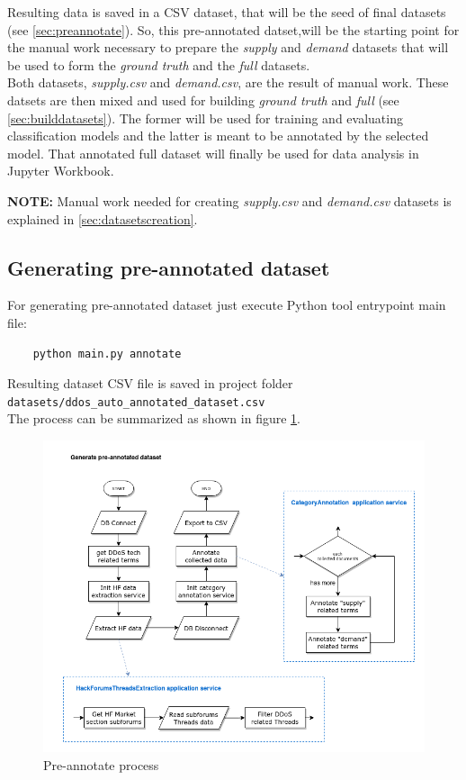 Resulting data is saved in a CSV dataset, that will be the seed of final datasets (see \autoref{sec:preannotate}). So, this pre-annotated datset,will be the starting point for the manual work necessary to prepare the \textit{supply} and \textit{demand} datasets that will be used to form the \textit{ground truth} and the \textit{full} datasets. \\
Both datasets, \textit{supply.csv} and \textit{demand.csv}, are the result of manual work. These datsets are then mixed and used for building \textit{ground truth} and \textit{full} (see \autoref{sec:builddatasets}). The former will be used for training and evaluating classification models and the latter is meant to be annotated by the selected model. That annotated full dataset will finally be used for data analysis in Jupyter Workbook.

\textbf{NOTE: } Manual work needed for creating \textit{supply.csv} and \textit{demand.csv} datasets is explained in \autoref{sec:datasetscreation}.

\newpage

\subsection{Generating pre-annotated dataset}
\label{sec:preannotate}

For generating pre-annotated dataset just execute Python tool entrypoint main file:
\begin{verbatim}
    python main.py annotate
\end{verbatim}
Resulting dataset CSV file is saved in project folder \texttt{datasets/ddos\_auto\_annotated\_dataset.csv} \\
The process can be summarized as shown in figure \ref{fig:preannotate}.

\begin{figure}[H]
	\centering
	\includegraphics[width=1.0\textwidth]{figs/preannotate.png}
	\caption{Pre-annotate process}
	\label{fig:preannotate}
\end{figure}

